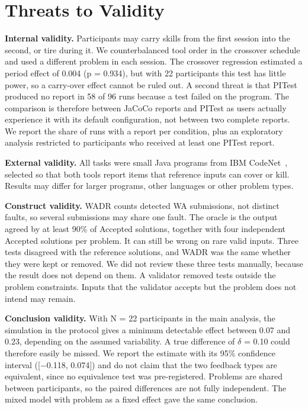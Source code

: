 \section{Threats to Validity}
\label{sec:threats}

\textbf{Internal validity.}
Participants may carry skills from the first session into the second, or tire during it. We counterbalanced tool order in the crossover schedule and used a different problem in each session. The crossover regression estimated a period effect of 0.004 (p = 0.934), but with 22 participants this test has little power, so a carry-over effect cannot be ruled out.
A second threat is that PITest produced no report in 58 of 96 runs because a test failed on the program. The comparison is therefore between JaCoCo reports and PITest as users actually experience it with its default configuration, not between two complete reports. We report the share of runs with a report per condition, plus an exploratory analysis restricted to participants who received at least one PITest report.

\textbf{External validity.}
All tasks were small Java programs from IBM CodeNet~\cite{puri2021}, selected so that both tools report items that reference inputs can cover or kill. Results may differ for larger programs, other languages or other problem types.

\textbf{Construct validity.}
WADR counts detected WA submissions, not distinct faults, so several submissions may share one fault.
The oracle is the output agreed by at least 90\% of Accepted solutions, together with four independent Accepted solutions per problem. It can still be wrong on rare valid inputs. Three tests disagreed with the reference solutions, and WADR was the same whether they were kept or removed. We did not review these three tests manually, because the result does not depend on them.
A validator removed tests outside the problem constraints. Inputs that the validator accepts but the problem does not intend may remain.

\textbf{Conclusion validity.}
With N = 22 participants in the main analysis, the simulation in the protocol gives a minimum detectable effect between 0.07 and 0.23, depending on the assumed variability. A true difference of $\delta$ = 0.10 could therefore easily be missed. We report the estimate with its 95\% confidence interval ([$-$0.118, 0.074]) and do not claim that the two feedback types are equivalent, since no equivalence test was pre-registered.
Problems are shared between participants, so the paired differences are not fully independent. The mixed model with problem as a fixed effect gave the same conclusion.
